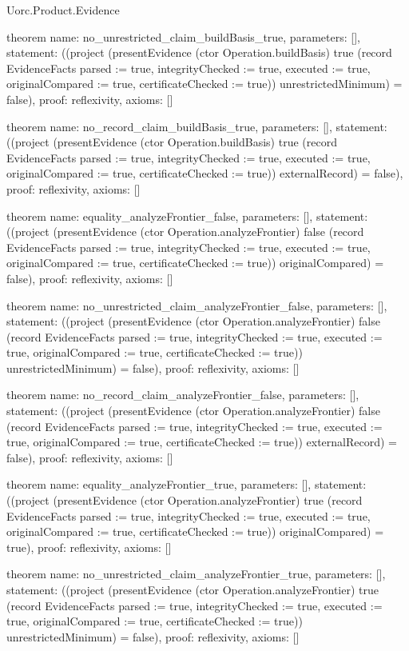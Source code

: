 \begin{lexlean}{Uorc.Product.Evidence}
\begin{semanticmodule}
theorem{
  name: no_unrestricted_claim_buildBasis_true,
  parameters: [],
  statement: ((project (presentEvidence (ctor Operation.buildBasis) true (record EvidenceFacts {parsed := true, integrityChecked := true, executed := true, originalCompared := true, certificateChecked := true})) unrestrictedMinimum) = false),
  proof: reflexivity{},
  axioms: []
}

theorem{
  name: no_record_claim_buildBasis_true,
  parameters: [],
  statement: ((project (presentEvidence (ctor Operation.buildBasis) true (record EvidenceFacts {parsed := true, integrityChecked := true, executed := true, originalCompared := true, certificateChecked := true})) externalRecord) = false),
  proof: reflexivity{},
  axioms: []
}

theorem{
  name: equality_analyzeFrontier_false,
  parameters: [],
  statement: ((project (presentEvidence (ctor Operation.analyzeFrontier) false (record EvidenceFacts {parsed := true, integrityChecked := true, executed := true, originalCompared := true, certificateChecked := true})) originalCompared) = false),
  proof: reflexivity{},
  axioms: []
}

theorem{
  name: no_unrestricted_claim_analyzeFrontier_false,
  parameters: [],
  statement: ((project (presentEvidence (ctor Operation.analyzeFrontier) false (record EvidenceFacts {parsed := true, integrityChecked := true, executed := true, originalCompared := true, certificateChecked := true})) unrestrictedMinimum) = false),
  proof: reflexivity{},
  axioms: []
}

theorem{
  name: no_record_claim_analyzeFrontier_false,
  parameters: [],
  statement: ((project (presentEvidence (ctor Operation.analyzeFrontier) false (record EvidenceFacts {parsed := true, integrityChecked := true, executed := true, originalCompared := true, certificateChecked := true})) externalRecord) = false),
  proof: reflexivity{},
  axioms: []
}

theorem{
  name: equality_analyzeFrontier_true,
  parameters: [],
  statement: ((project (presentEvidence (ctor Operation.analyzeFrontier) true (record EvidenceFacts {parsed := true, integrityChecked := true, executed := true, originalCompared := true, certificateChecked := true})) originalCompared) = true),
  proof: reflexivity{},
  axioms: []
}

theorem{
  name: no_unrestricted_claim_analyzeFrontier_true,
  parameters: [],
  statement: ((project (presentEvidence (ctor Operation.analyzeFrontier) true (record EvidenceFacts {parsed := true, integrityChecked := true, executed := true, originalCompared := true, certificateChecked := true})) unrestrictedMinimum) = false),
  proof: reflexivity{},
  axioms: []
}


\end{semanticmodule}
\end{lexlean}
